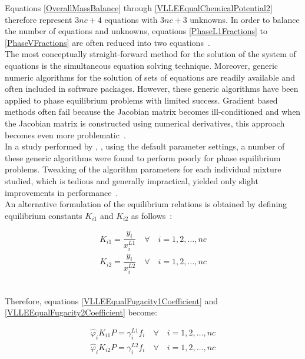 Equations \ref{OverallMassBalance} through \ref{VLLEEqualChemicalPotential2} therefore represent $3nc + 4$ equations with $3nc +3$ unknowns. In order to balance the number of equations and unknowns, equations \ref{PhaseL1Fractions} to \ref{PhaseVFractions} are often reduced into two equations~\cite{PhaseEquilCalcsESandGEM}.\\

The most conceptually straight-forward method for the solution of the system of equations is the simultaneous equation solving technique. Moreover, generic numeric algorithms for the solution of sets of equations are readily available and often included in software packages. However, these generic algorithms have been applied to phase equilibrium problems with limited success. Gradient based methods often fail because the Jacobian matrix becomes ill-conditioned and when the Jacobian matrix is constructed using numerical derivatives, this approach becomes even more problematic~\cite{PhaseEquilCalcsESandGEM}.\\

In a study performed by \citeauthor{PhaseEquilCalcsESandGEM}, \citeyear{PhaseEquilCalcsESandGEM}, using the default parameter settings, a number of these generic algorithms were found to perform poorly for phase equilibrium problems. Tweaking of the algorithm parameters for each individual mixture studied, which is tedious and generally impractical, yielded only slight improvements in  performance~\cite{PhaseEquilCalcsESandGEM}.\\

An alternative formulation of the equilibrium relations is obtained by defining equilibrium constants $K_{i1}$ and $K_{i2}$ as follows~\cite{PhaseEquilCalcsESandGEM, ThermodynamicModels, ComputerCalculationsVLEandLLE, HybridFlashCalculations}:\

\begin{eqnarray}
K_{i1} = \dfrac{y_{i}}{x_{i}^{L1}} \quad \forall \quad i = 1, 2,\ldots, nc \label{EquilibriumK1VLLE}\\
K_{i2} = \dfrac{y_{i}}{x_{i}^{L2}} \quad \forall \quad i = 1, 2,\ldots, nc \label{EquilibriumK2VLLE}
\end{eqnarray}\


Therefore, equations \ref{VLLEEqualFugacity1Coefficient} and \ref{VLLEEqualFugacity2Coefficient} become:\

\begin{eqnarray}
\hat{\varphi}_{i}K_{i1}P = \gamma^{L1}_{i}f_{i} \quad \forall \quad i = 1, 2,\ldots, nc \label{VLLEEqualFugacity1K}\\
\hat{\varphi}_{i}K_{i2}P = \gamma^{L2}_{i}f_{i} \quad \forall \quad i = 1, 2,\ldots, nc \label{VLLEEqualFugacity2K}
\end{eqnarray}\

